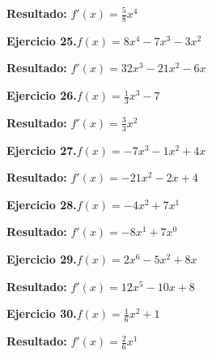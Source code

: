 \documentclass[10pt,a4paper]{article}
\begin{document}
\begin{solbox}
\textbf{Resultado:} \(\displaystyle f'(x) = \frac{5}{8}x^{4}\)
\end{solbox}

\newpage
\begin{ejbox}
\textbf{Ejercicio 25.}\quad $f(x) = 8x^4 -7x^3 -3x^2$
\end{ejbox}

\begin{solbox}
\textbf{Resultado:} \(\displaystyle f'(x) = 32x^3 -21x^2 -6x\)
\end{solbox}

\begin{ejbox}
\textbf{Ejercicio 26.}\quad $f(x) = \frac{1}{3}x^{3} -7$
\end{ejbox}

\begin{solbox}
\textbf{Resultado:} \(\displaystyle f'(x) = \frac{3}{3}x^{2}\)
\end{solbox}

\begin{ejbox}
\textbf{Ejercicio 27.}\quad $f(x) = -7x^3 -1x^2 +4x$
\end{ejbox}

\begin{solbox}
\textbf{Resultado:} \(\displaystyle f'(x) = -21x^2 -2x +4\)
\end{solbox}

\newpage
\begin{ejbox}
\textbf{Ejercicio 28.}\quad $f(x) = -4x^{2} + 7x^{1}$
\end{ejbox}

\begin{solbox}
\textbf{Resultado:} \(\displaystyle f'(x) = -8x^{1} + 7x^{0}\)
\end{solbox}

\begin{ejbox}
\textbf{Ejercicio 29.}\quad $f(x) = 2x^{6} -5x^2 +8x$
\end{ejbox}

\begin{solbox}
\textbf{Resultado:} \(\displaystyle f'(x) = 12x^{5} -10x +8\)
\end{solbox}

\begin{ejbox}
\textbf{Ejercicio 30.}\quad $f(x) = \frac{1}{6}x^{2} +1$
\end{ejbox}

\begin{solbox}
\textbf{Resultado:} \(\displaystyle f'(x) = \frac{2}{6}x^{1}\)
\end{solbox}
\end{document}

